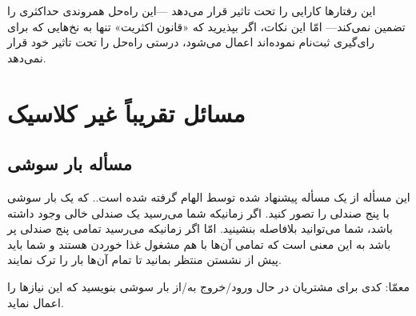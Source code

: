 \documentclass{book}
\newcommand{\clearemptydoublepage}{\newpage\cleardoublepage}
\begin{document}
    این رفتارها کارایی را تحت تاثیر قرار می‌دهد ---این راه‌حل همروندی حداکثری را تضمین نمی‌کند--- امّا این نکات،
    اگر بپذیرید که «قانون اکثریت»  تنها به نخ‌هایی که برای رای‌گیری ثبت‌نام نموده‌اند اعمال می‌شود، 
    درستی راه‌حل را تحت تاثیر خود قرار نمی‌دهد. 
    


\clearemptydoublepage
\chapter{مسائل تقریباً غیر کلاسیک}

\section{مسأله بار سوشی}

    این مسأله از یک مسأله پیشنهاد شده توسط  الهام گرفته شده است.\cite{reek}. که یک بار سوشی با پنج صندلی را  تصور کنید.
    اگر زمانیکه شما می‌رسید یک صندلی خالی وجود داشته باشد، شما می‌توانید بلافاصله بنشینید. امّا اگر زمانیکه می‌رسید تمامی پنج صندلی پر باشد 
    به این معنی است که تمامی آن‌ها با هم مشغول غذا خوردن هستند و شما باید پیش از نشستن منتظر بمانید تا تمام آن‌ها بار را ترک نمایند. 
    

    معمّا: کدی برای مشتریان در حال ورود/خروج  به/از بار سوشی بنویسید که این نیازها را اعمال نماید. 

\clearemptydoublepage
\end{document}
